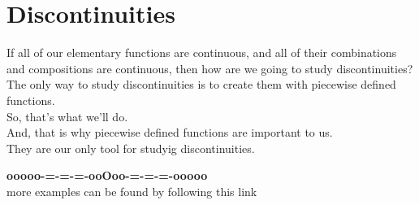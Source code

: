 \documentclass{ximera}
\begin{document}
\section*{Discontinuities}


If all of our elementary functions are continuous, and all of their combinations and compositions are continuous, then how are we going to study discontinuities? \\


The only way to study discontinuities is to create them with piecewise defined functions. \\

So, that's what we'll do. \\


And, that is why piecewise defined functions are important to us.  \\

They are our only tool for studyig discontinuities.






























\begin{center}
\textbf{\textcolor{green!50!black}{ooooo-=-=-=-ooOoo-=-=-=-ooooo}} \\

more examples can be found by following this link\\ 

\end{center}
\end{document}
